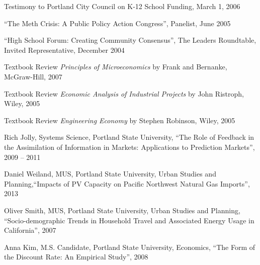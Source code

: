 \documentclass[Computer Science]{vita}
\begin{document}
\begin{vita}
\begin{Community Outreach}
  \item Testimony to Portland City Council on K-12 School Funding,
    March 1, 2006

  \item ``The Meth Crisis: A Public Policy Action Congress'',
    Panelist, June 2005

  \item ``High School Forum: Creating Community Consensus'', The
    Leaders Roundtable, Invited Representative, December 2004
  \end{Community Outreach}

  \begin{Instructional Activities}

    \begin{Reviews}
    \item Textbook Review \emph{Principles of Microeconomics} by
      Frank and Bernanke, McGraw-Hill, 2007

    \item Textbook Review \emph{Economic Analysis of Industrial
        Projects} by John Ristroph, Wiley, 2005

    \item Textbook Review \emph{Engineering Economy} by Stephen
      Robinson, Wiley, 2005
    \end{Reviews}

    \begin{Ph.D. Thesis Committee}
    \item Rich Jolly, Systems Science, Portland State University,
      ``The Role of Feedback in the Assimilation of Information in
      Markets: Applications to Prediction Markets'', 2009 -- 2011


    \end{Ph.D. Thesis Committee}

    \begin{M.S. Thesis Adviser}
    \item Daniel Weiland, MUS, Portland State University,
      Urban Studies and Planning,``Impacts of PV Capacity on Pacific Northwest Natural Gas Imports'', 2013
    
    \item Oliver Smith, MUS, Portland State University,
      Urban Studies and Planning, ``Socio-demographic Trends in
      Household Travel and Associated Energy Usage in California'',
      2007

    \end{M.S. Thesis Adviser}

    \begin{M.S. Project Adviser}
    \item Anna Kim, M.S. Candidate, Portland State University,
      Economics, ``The Form of the Discount Rate: An Empirical
      Study'', 2008


\end{M.S. Project Adviser}
\end{Instructional Activities}
\end{vita}
\end{document}
